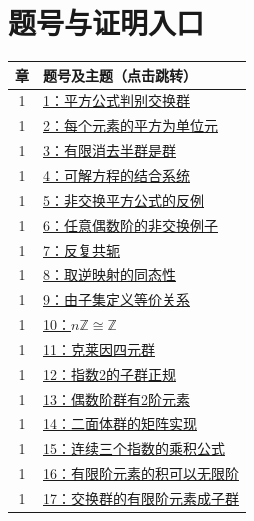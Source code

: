 \documentclass[UTF8,a4paper,11pt,fontset=windows]{ctexart}
\newcommand{\Z}{\mathbb Z}\newcommand{\Q}{\mathbb Q}
\begin{document}
\clearpage\section*{题号与证明入口}
\small\begin{longtable}{cp{13.5cm}}
\toprule 章 & 题号及主题（点击跳转）\\\midrule\endhead

1 & \hyperref[ex:1:1]{1：平方公式判别交换群}\\

1 & \hyperref[ex:1:2]{2：每个元素的平方为单位元}\\

1 & \hyperref[ex:1:3]{3：有限消去半群是群}\\

1 & \hyperref[ex:1:4]{4：可解方程的结合系统}\\

1 & \hyperref[ex:1:5]{5：非交换平方公式的反例}\\

1 & \hyperref[ex:1:6]{6：任意偶数阶的非交换例子}\\

1 & \hyperref[ex:1:7]{7：反复共轭}\\

1 & \hyperref[ex:1:8]{8：取逆映射的同态性}\\

1 & \hyperref[ex:1:9]{9：由子集定义等价关系}\\

1 & \hyperref[ex:1:10]{10：$n\Z\cong\Z$}\\

1 & \hyperref[ex:1:11]{11：克莱因四元群}\\

1 & \hyperref[ex:1:12]{12：指数2的子群正规}\\

1 & \hyperref[ex:1:13]{13：偶数阶群有2阶元素}\\

1 & \hyperref[ex:1:14]{14：二面体群的矩阵实现}\\

1 & \hyperref[ex:1:15]{15：连续三个指数的乘积公式}\\

1 & \hyperref[ex:1:16]{16：有限阶元素的积可以无限阶}\\

1 & \hyperref[ex:1:17]{17：交换群的有限阶元素成子群}\\


\end{longtable}
\end{document}
